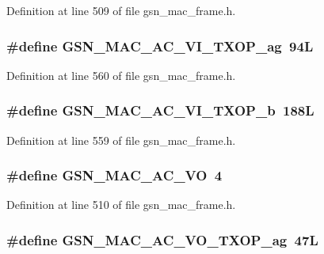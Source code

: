 Definition at line 509 of file gsn\_\-mac\_\-frame.h.

\hypertarget{a00523_a8808ccaa913e1e40bc760d961601e147}{
\subsubsection[{GSN\_\-MAC\_\-AC\_\-VI\_\-TXOP\_\-ag}]{\setlength{\rightskip}{0pt plus 5cm}\#define GSN\_\-MAC\_\-AC\_\-VI\_\-TXOP\_\-ag~94L}}
\label{a00523_a8808ccaa913e1e40bc760d961601e147}


Definition at line 560 of file gsn\_\-mac\_\-frame.h.

\hypertarget{a00523_af41dfcb86f8d6bba057fcadf9f2eeed4}{
\subsubsection[{GSN\_\-MAC\_\-AC\_\-VI\_\-TXOP\_\-b}]{\setlength{\rightskip}{0pt plus 5cm}\#define GSN\_\-MAC\_\-AC\_\-VI\_\-TXOP\_\-b~188L}}
\label{a00523_af41dfcb86f8d6bba057fcadf9f2eeed4}


Definition at line 559 of file gsn\_\-mac\_\-frame.h.

\hypertarget{a00523_a4de3fa81752356dc23b5990b02a54513}{
\subsubsection[{GSN\_\-MAC\_\-AC\_\-VO}]{\setlength{\rightskip}{0pt plus 5cm}\#define GSN\_\-MAC\_\-AC\_\-VO~4}}
\label{a00523_a4de3fa81752356dc23b5990b02a54513}


Definition at line 510 of file gsn\_\-mac\_\-frame.h.

\hypertarget{a00523_add2eb5c2203b0c2084b4f650c08ee721}{
\subsubsection[{GSN\_\-MAC\_\-AC\_\-VO\_\-TXOP\_\-ag}]{\setlength{\rightskip}{0pt plus 5cm}\#define GSN\_\-MAC\_\-AC\_\-VO\_\-TXOP\_\-ag~47L}}
\label{a00523_add2eb5c2203b0c2084b4f650c08ee721}



